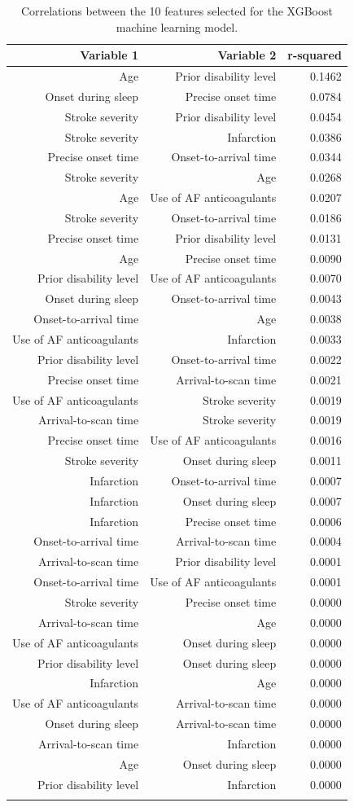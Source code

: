 \begin{longtable}[]{@{}rrr@{}}
\caption{Correlations between the 10 features selected for the XGBoost machine learning model.}\\
\toprule
Variable 1 & Variable 2 & r-squared\tabularnewline
\midrule
\endhead
Age & Prior disability level & 0.1462\tabularnewline
Onset during sleep & Precise onset time & 0.0784\tabularnewline
Stroke severity & Prior disability level & 0.0454\tabularnewline
Stroke severity & Infarction & 0.0386\tabularnewline
Precise onset time & Onset-to-arrival time & 0.0344\tabularnewline
Stroke severity & Age & 0.0268\tabularnewline
Age & Use of AF anticoagulants & 0.0207\tabularnewline
Stroke severity & Onset-to-arrival time & 0.0186\tabularnewline
Precise onset time & Prior disability level & 0.0131\tabularnewline
Age & Precise onset time & 0.0090\tabularnewline
Prior disability level & Use of AF anticoagulants &
0.0070\tabularnewline
Onset during sleep & Onset-to-arrival time & 0.0043\tabularnewline
Onset-to-arrival time & Age & 0.0038\tabularnewline
Use of AF anticoagulants & Infarction & 0.0033\tabularnewline
Prior disability level & Onset-to-arrival time & 0.0022\tabularnewline
Precise onset time & Arrival-to-scan time & 0.0021\tabularnewline
Use of AF anticoagulants & Stroke severity & 0.0019\tabularnewline
Arrival-to-scan time & Stroke severity & 0.0019\tabularnewline
Precise onset time & Use of AF anticoagulants & 0.0016\tabularnewline
Stroke severity & Onset during sleep & 0.0011\tabularnewline
Infarction & Onset-to-arrival time & 0.0007\tabularnewline
Infarction & Onset during sleep & 0.0007\tabularnewline
Infarction & Precise onset time & 0.0006\tabularnewline
Onset-to-arrival time & Arrival-to-scan time & 0.0004\tabularnewline
Arrival-to-scan time & Prior disability level & 0.0001\tabularnewline
Onset-to-arrival time & Use of AF anticoagulants & 0.0001\tabularnewline
Stroke severity & Precise onset time & 0.0000\tabularnewline
Arrival-to-scan time & Age & 0.0000\tabularnewline
Use of AF anticoagulants & Onset during sleep & 0.0000\tabularnewline
Prior disability level & Onset during sleep & 0.0000\tabularnewline
Infarction & Age & 0.0000\tabularnewline
Use of AF anticoagulants & Arrival-to-scan time & 0.0000\tabularnewline
Onset during sleep & Arrival-to-scan time & 0.0000\tabularnewline
Arrival-to-scan time & Infarction & 0.0000\tabularnewline
Age & Onset during sleep & 0.0000\tabularnewline
Prior disability level & Infarction & 0.0000\tabularnewline
\bottomrule
\label{tab:correl}
\end{longtable}



